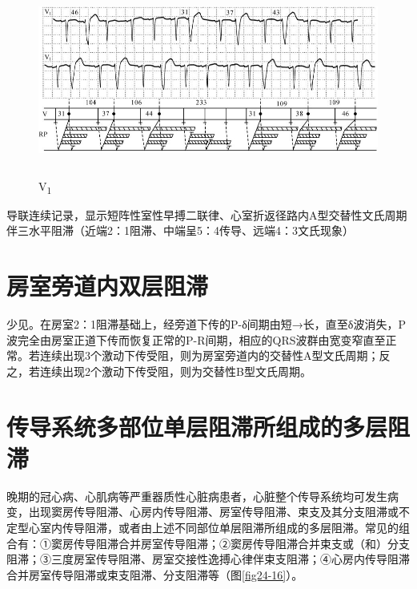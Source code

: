 \begin{figure}[!htbp]
 \centering
 \includegraphics[width=5.70833in,height=2.46875in]{./images/Image00410.jpg}
 \captionsetup{justification=centering}
 \caption{V\textsubscript{1}}
 \label{fig24-15}
  \end{figure} 
导联连续记录，显示短阵性室性早搏二联律、心室折返径路内A型交替性文氏周期伴三水平阻滞（近端2：1阻滞、中端呈5：4传导、远端4：3文氏现象）

\protect\hypertarget{text00031.htmlux5cux23subid371}{}{}

\section{房室旁道内双层阻滞}

少见。在房室2：1阻滞基础上，经旁道下传的P-δ间期由短→长，直至δ波消失，P波完全由房室正道下传而恢复正常的P-R间期，相应的QRS波群由宽变窄直至正常。若连续出现3个激动下传受阻，则为房室旁道内的交替性A型文氏周期；反之，若连续出现2个激动下传受阻，则为交替性B型文氏周期。

\protect\hypertarget{text00031.htmlux5cux23subid372}{}{}

\section{传导系统多部位单层阻滞所组成的多层阻滞}

晚期的冠心病、心肌病等严重器质性心脏病患者，心脏整个传导系统均可发生病变，出现窦房传导阻滞、心房内传导阻滞、房室传导阻滞、束支及其分支阻滞或不定型心室内传导阻滞，或者由上述不同部位单层阻滞所组成的多层阻滞。常见的组合有：①窦房传导阻滞合并房室传导阻滞；②窦房传导阻滞合并束支或（和）分支阻滞；③三度房室传导阻滞、房室交接性逸搏心律伴束支阻滞；④心房内传导阻滞合并房室传导阻滞或束支阻滞、分支阻滞等（图\ref{fig24-16}）。

